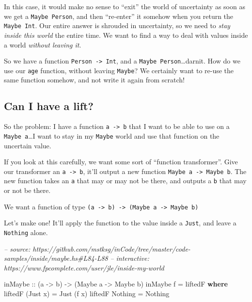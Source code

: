 \documentclass[]{article}
\newenvironment{Shaded}{}{}
\newcommand{\CommentTok}[1]{\textcolor[rgb]{0.38,0.63,0.69}{\textit{#1}}}
\newcommand{\DataTypeTok}[1]{\textcolor[rgb]{0.56,0.13,0.00}{#1}}
\newcommand{\FunctionTok}[1]{\textcolor[rgb]{0.02,0.16,0.49}{#1}}
\newcommand{\KeywordTok}[1]{\textcolor[rgb]{0.00,0.44,0.13}{\textbf{#1}}}
\newcommand{\NormalTok}[1]{#1}
\newcommand{\OtherTok}[1]{\textcolor[rgb]{0.00,0.44,0.13}{#1}}
\begin{document}
In this case, it would make no sense to ``exit'' the world of uncertainty as
soon as we get a \texttt{Maybe\ Person}, and then ``re-enter'' it somehow when
you return the \texttt{Maybe\ Int}. Our entire answer is shrouded in
uncertainty, so we need to \emph{stay inside this world} the entire time. We
want to find a way to deal with values inside a world \emph{without leaving it}.

So we have a function \texttt{Person\ -\textgreater{}\ Int}, and a
\texttt{Maybe\ Person}\ldots{}darnit. How do we use our \texttt{age} function,
without leaving \texttt{Maybe}? We certainly want to re-use the same function
somehow, and not write it again from scratch!

\hypertarget{can-i-have-a-lift}{%
\subsection{Can I have a lift?}\label{can-i-have-a-lift}}

So the problem: I have a function \texttt{a\ -\textgreater{}\ b} that I want to
be able to use on a \texttt{Maybe\ a}\ldots{}I want to stay in my \texttt{Maybe}
world and use that function on the uncertain value.

If you look at this carefully, we want some sort of ``function transformer''.
Give our transformer an \texttt{a\ -\textgreater{}\ b}, it'll output a new
function \texttt{Maybe\ a\ -\textgreater{}\ Maybe\ b}. The new function takes an
\texttt{a} that may or may not be there, and outputs a \texttt{b} that may or
not be there.

We want a function of type
\texttt{(a\ -\textgreater{}\ b)\ -\textgreater{}\ (Maybe\ a\ -\textgreater{}\ Maybe\ b)}

Let's make one! It'll apply the function to the value inside a \texttt{Just},
and leave a \texttt{Nothing} alone.

\begin{Shaded}
\begin{Highlighting}[]
\CommentTok{-- source: https://github.com/mstksg/inCode/tree/master/code-samples/inside/maybe.hs#L84-L88}
\CommentTok{-- interactive: https://www.fpcomplete.com/user/jle/inside-my-world}

\OtherTok{inMaybe ::}\NormalTok{ (a }\OtherTok{->}\NormalTok{ b) }\OtherTok{->}\NormalTok{ (}\DataTypeTok{Maybe}\NormalTok{ a }\OtherTok{->} \DataTypeTok{Maybe}\NormalTok{ b)}
\NormalTok{inMaybe f }\FunctionTok{=}\NormalTok{ liftedF}
  \KeywordTok{where}
\NormalTok{    liftedF (}\DataTypeTok{Just}\NormalTok{ x) }\FunctionTok{=} \DataTypeTok{Just}\NormalTok{ (f x)}
\NormalTok{    liftedF }\DataTypeTok{Nothing}  \FunctionTok{=} \DataTypeTok{Nothing}
\end{Highlighting}
\end{Shaded}
\end{document}
